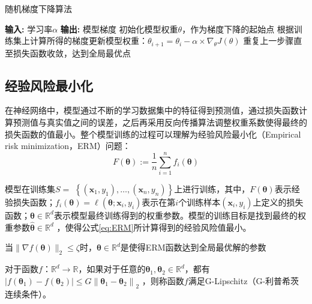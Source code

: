 \begin{algorithm}[!htb]
	\caption{随机梯度下降算法}
	\label{随机梯度下降算法}
	\begin{algorithmic}[1]
		\footnotesize
		\STATE \textbf{输入:} 学习率$\alpha$
		\STATE \textbf{输出:} 模型梯度
		\STATE 初始化模型权重$\theta$，作为梯度下降的起始点
		\STATE 根据训练集上计算所得的梯度更新模型权重：$\theta_{i+1}=\theta_{i}-\alpha \times \nabla_{\theta} J(\theta)$
		\STATE 重复上一步骤直至损失函数收敛，达到全局最优点
	\end{algorithmic}
\end{algorithm}

\subsection{经验风险最小化}
在神经网络中，模型通过不断的学习数据集中的特征得到预测值，通过损失函数计算预测值与真实值之间的误差，之后再采用反向传播算法调整权重系数使得最终的损失函数的值最小。整个模型训练的过程可以理解为经验风险最小化（Empirical risk minimization，ERM）问题：
\begin{equation}\label{eq:ERM}
F(\boldsymbol{\theta}):=\frac{1}{n} \sum_{i=1}^{n} f_{i}(\boldsymbol{\theta})
\end{equation}

模型在训练集$S=$ $\left\{\left(\mathbf{x}_{1}, y_{1}\right), \ldots,\left(\mathbf{x}_{n}, y_{n}\right)\right\}$上进行训练，其中，$F(\boldsymbol{\theta})$表示经验损失函数；$f_{i}(\boldsymbol{\theta})=\ell\left(\boldsymbol{\theta} ; \mathbf{x}_{i}, y_{i}\right)$表示在第$i$个训练样本$\left(\mathbf{x}_{i}, y_{i}\right)$上定义的损失函数；$\boldsymbol{\theta} \in \mathbb{R}^{d}$表示模型最终训练得到的权重参数。模型的训练目标是找到最终的权重参数$\widehat{\boldsymbol{\theta}} \in \mathbb{R}^{d}$ ，使得公式\ref{eq:ERM}所计算得到的经验风险值最小。

\begin{define}\label{全局最优点}
当$\|\nabla f(\boldsymbol{\theta})\|_{2} \leq \zeta$时，$\boldsymbol{\theta} \in \mathbb{R}^{d}$是使得ERM函数达到全局最优解的参数
\end{define}

\begin{define}\label{G-Lipschitz}
对于函数$f$：$\mathbb{R}^{d} \rightarrow \mathbb{R}$，如果对于任意的$\boldsymbol{\theta}_{1}, \boldsymbol{\theta}_{2} \in \mathbb{R}^{d}$，都有$\left|f\left(\boldsymbol{\theta}_{1}\right)-f\left(\boldsymbol{\theta}_{2}\right)\right| \leq G\left\|\boldsymbol{\theta}_{1}-\boldsymbol{\theta}_{2}\right\|_{2}$
，则称函数$f$满足G-Lipschitz（G-利普希茨连续条件）。
\end{define}

